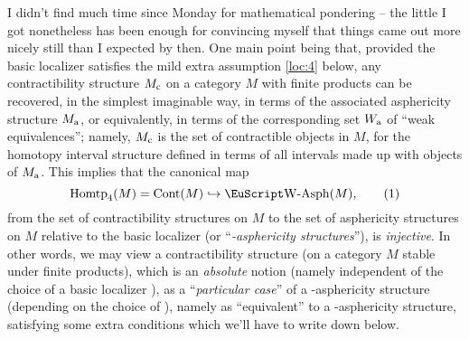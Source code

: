 \label{sec:81}%
I didn't find much time since Monday for mathematical pondering -- the
little I got nonetheless has been enough for convincing myself that
things came out more nicely still than I expected by then. One main
point being that, provided the basic localizer satisfies the mild
extra assumption \ref{loc:4} below, any contractibility structure
$M_{\mathrm{c}}$ on a category $M$ with finite products can be recovered, in
the simplest imaginable way, in terms of the associated asphericity
structure $M_{\mathrm{a}}$, or equivalently, in terms of the corresponding set
$W_{\mathrm{a}}$ of ``weak equivalences''; namely, $M_{\mathrm{c}}$ is the set of
contractible objects in $M$, for the homotopy interval structure
defined in terms of all intervals made up with objects of
$M_{\mathrm{a}}$. This implies that the canonical map
\begin{equation}
  \label{eq:81.1}
  \Homtp_4(M) = \Cont(M) \hookrightarrow \WAsph(M),\tag{1}
\end{equation}
from the set of contractibility structures on $M$ to the set of
asphericity structures on $M$ relative to the basic localizer \scrW{}
(or ``\emph{\scrW-asphericity structures}''), is \emph{injective}. In
other words, we may view a contractibility structure (on a category
$M$ stable under finite products), which is an \emph{absolute} notion
(namely independent of the choice of a basic localizer \scrW), as a
``\emph{particular case}'' of a \scrW-asphericity structure (depending
on the choice of \scrW), namely as ``equivalent'' to a
\scrW-asphericity structure, satisfying some extra conditions which
we'll have to write down below.

